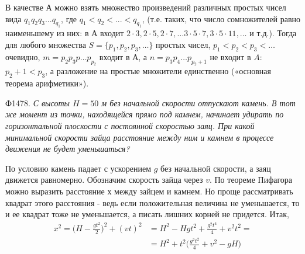 \documentclass{article}
\begin{document}
\begin{multicols}{2}
В качестве А можно взять множество произведений различных простых чисел вида $q_1q_2q_3...q_{q_1}$, где $q_1<q_2<...<q_{q_1}$, (т.е. таких, что число сомножителей равно наименьшему из них: в $А$ входит $2 \cdot 3, 2 \cdot 5, 2\cdot 7,… 3 \cdot 5 \cdot 7, 3 \cdot 5 \cdot 11,…$ и т.д.). Тогда для любого множества $S=\{p_1, p_2, p_3, …\}$ простых чисел, $p_1 < p_2 < p_3 < …$ очевидно, $m=p_2p_3p … p_{p_2}$ входит в $А$, а $n=p_3p_4 … p_{p_2+1}$ не входит в $A$: $p_2 + 1 <  p_3$, а разложение на простые множители единственно («основная теорема арифметики»).\\\par
Ф1478. \textit{С высоты $H = 50$ м без начальной скорости отпускают камень. В тот же момент из точки, находящейся прямо под камнем, начинает удирать по горизонтальной плоскости с постоянной скоростью заяц. При какой минимальной скорости зайца расстояние между ним и камнем в процессе движения не будет уменьшаться?}\\\par
По условию камень падает с ускорением $g$ без начальной скорости, а заяц движется равномерно. Обозначим скорость зайца через $v$. По теореме Пифагора можно выразить расстояние $х$ между зайцем и камнем. Но проще рассматривать квадрат этого расстояния - ведь если положительная величина не уменьшается, то и ее квадрат тоже не уменьшается, а писать лишних корней не придется. Итак,
\begin{align*}
x^2 = \bigg(H - \frac{gt^2}{2}\bigg)^2 + (vt)^2 &= H^2 - Hgt^2 + \frac{g^2t^4}{4} + v^2t^2 = \\
&= H^2 + t^2\bigg(\frac{g^2t^2}{4} + v^2 - gH \bigg)
\end{align*}
    
\end{multicols}
\end{document}
